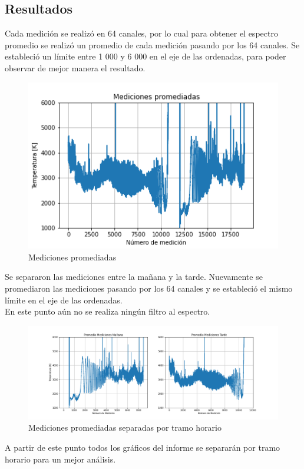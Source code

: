 \subsection{Resultados}
Cada medición se realizó en 64 canales, por lo cual para obtener el espectro promedio se realizó un promedio de cada medición pasando por los 64 canales. Se estableció un límite entre 1 000 y 6 000 en el eje de las ordenadas, para poder observar de mejor manera el resultado.
\begin{figure}[H]
\centering
\includegraphics[scale=0.55]{img/img/inf4graf1.png}
\caption{\label{fig:Grafico} Mediciones promediadas}
\end{figure}
Se separaron las mediciones entre la mañana y la tarde. Nuevamente se promediaron las mediciones pasando por los 64 canales y se estableció el mismo límite en el eje de las ordenadas.\\
En este punto aún no se realiza ningún filtro al espectro.
\begin{figure}[H]
\centering
\includegraphics[scale=0.4]{img/img/inf4graf2.png}
\caption{\label{fig:Grafico} Mediciones promediadas separadas por tramo horario}
\end{figure}
A partir de este punto todos los gráficos del informe se separarán por tramo horario para un mejor análisis.\\
